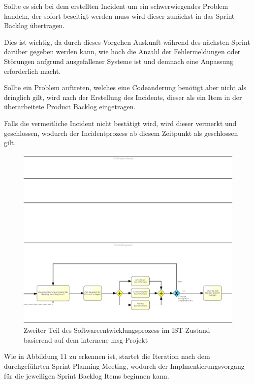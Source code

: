 Sollte es sich bei dem erstellten Incident um ein schwerwiegendes Problem handeln, der sofort beseitigt werden muss wird dieser zunächst in das Sprint Backlog übertragen.

Dies ist wichtig, da durch dieses Vorgehen Auskunft während des nächsten Sprint darüber gegeben werden kann, wie hoch die Anzahl der Fehlermeldungen oder Störungen aufgrund ausgefallener Systeme ist und demnach eine Anpassung erforderlich macht. 

Sollte ein Problem auftreten, welches eine Codeänderung benötigt aber nicht als dringlich gilt, wird nach der Erstellung des Incidents, dieser als ein Item in der überarbeitete Product Backlog eingetragen. 

Falls die vermeitliche Incident nicht bestätigt wird, wird dieser vermerkt und geschlossen, wodurch der Incidentprozess ab diesem Zeitpunkt als geschlossen gilt. \\ 

\begin{figure}[h]
    \centering
    \includegraphics[scale=0.6]{Bilder/IST-Prozess_second Part.png}
    \caption{Zweiter Teil des Softwareentwicklungsprozess im IST-Zustand basierend auf dem internene msg-Projekt}
\end{figure}

Wie in Abbildung 11 zu erkennen ist, startet die Iteration nach dem durchgeführten Sprint Planning Meeting, wodurch der Implmentierungsvorgang für die jeweiligen Sprint Backlog Items beginnen kann. 

